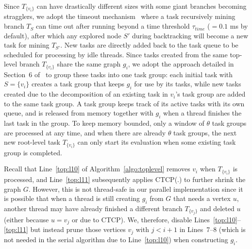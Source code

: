 \documentclass[sigconf, nonacm]{acmart}
\begin{document}
Since $T_{\{v_i\}}$ can have drastically different sizes with some giant branches becoming stragglers, we adopt the timeout mechanism~\cite{guimu_vldb,jalal_vldbj,maximal_qihao,tfsm,tdfs} where a task recursively mining branch $T_S$ can time out after running beyond a time threshold $\tau_{time}$ ($=0.1$ ms by default), after which any explored node $S'$ during backtracking will become a new task for mining $T_{S'}$. New tasks are directly added back to the task queue to be scheduled for processing by idle threads. %
Since tasks created from the same top-level branch $T_{\{v_i\}}$ share the same graph $g_i$, we adopt the approach detailed in Section~6 of~\cite{maximal_qihao} to group these tasks into one task group: each initial task with $S=\{v_i\}$ creates a task group that keeps $g_i$ for use by its tasks, while new tasks created due to the decomposition of an existing task in $v_i$'s task group are added to the same task group. A task group keeps track of its active tasks with its own queue, and is released from memory together with $g_i$ when a thread finishes the last task in the group. To keep memory bounded, only a window of $\theta$ task groups are processed at any time, and when there are already $\theta$ task groups, the next new root-level task $T_{\{v_i\}}$ can only start its evaluation when some existing task group is completed.


Recall that Line~\ref{top:l10} of Algorithm~\ref{algo:toplevel} removes $v_i$ when $T_{\{v_i\}}$ is processed, and Line~\ref{top:l11} subsequently applies CTCP(.) to further shrink the graph $G$. However, this is not thread-safe in our parallel implementation since it is possible that when a thread is still creating $g_i$ from $G$ that needs a vertex $u$, another thread may have already finished a different branch $T_{\{v_j\}}$ and deleted $u$ (either because $u=v_j$ or due to CTCP). We, therefore, disable Lines~\ref{top:l10}--\ref{top:l11} but instead prune those vertices $v_j$ with $j<i+1$ in Lines~7--8 (which is not needed in the serial algorithm due to Line~\ref{top:l10}) when constructing $g_i$.

\vspace{-2mm}
\end{document}
